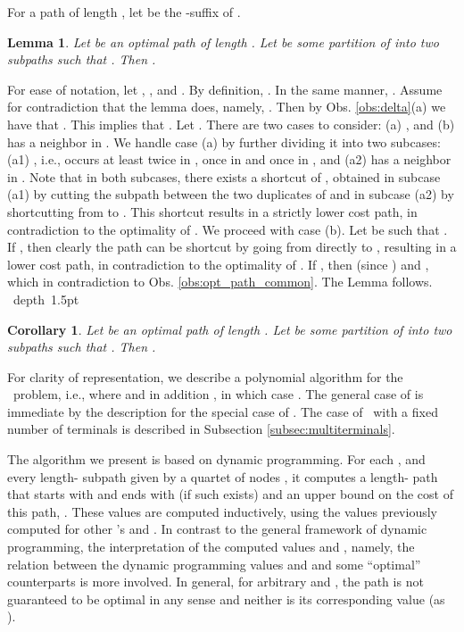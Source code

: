 \documentclass[12pt]{article}
\newtheorem{lemma}[theorem]{Lemma}
\newtheorem{corollary}[theorem]{Corollary}
\def\Proof{\par\noindent{\bf Proof:~}}
\def\blackslug{\hbox{\hskip 1pt \vrule width 4pt height 8pt
    depth 1.5pt \hskip 1pt}}
\def\QED{\quad\blackslug\lower 8.5pt\null\par}
\newcommand{\PS}[0]{ 
}
\newcommand{\PP}[0]{ }
\begin{document}
For a path  of length , let  be the -suffix of .
\begin{lemma}
\label{lem:opt_path_common}
Let  be an optimal  path of length . Let  be some partition of  into two subpaths such that . Then .
\end{lemma}
\Proof
For ease of notation, let , , and . By definition, . In the same manner, .  Assume for contradiction that the lemma does, namely, . Then by Obs. \ref{obs:delta}(a) we have that . This implies that . Let . There are two cases to consider: (a) , and (b)  has a neighbor  in . We handle case (a) by further dividing it into two subcases: (a1) , i.e.,  occurs at least twice in , once in  and once in , and (a2)  has a neighbor  in . Note that in both subcases, there exists a shortcut of , obtained in subcase (a1) by cutting the subpath between the two duplicates of  and in subcase (a2) by shortcutting from  to .  This shortcut results in a strictly lower cost path, in contradiction to the optimality of . We proceed with case (b).
Let  be such that . If , then clearly the path can be shortcut by going from  directly to , resulting in a lower cost path, in contradiction to the optimality of . If , then  (since ) and , which in contradiction to Obs. \ref{obs:opt_path_common}. The Lemma follows.
\QED
\begin{corollary}
\label{cor:opt_path_common}
Let  be an optimal  path of length . Let  be some partition of  into two subpaths such that . Then .
\end{corollary}
For clarity of representation, we describe a polynomial algorithm for the \PP\ problem, i.e., where  and in addition , in which case .
The general case of  is immediate by the description for the special case of . The case of \PS\ with a fixed number of terminals  is described in Subsection \ref{subsec:multiterminals}. 
\par The algorithm we present is based on dynamic programming.
For each , and every length- subpath given by a quartet of nodes , it computes a length- path  that  starts with  and ends with  (if such exists) and an upper bound  on the cost of this path, . These values are computed inductively, using the values previously computed for other 's and . In contrast to the general framework of dynamic programming, the interpretation of the computed values  and , namely, the relation between the dynamic programming values  and  and some ``optimal'' counterparts  is more involved. In general, for arbitrary  and , the path  is not guaranteed to be optimal in any sense and neither is its corresponding value  (as ).
\end{document}

